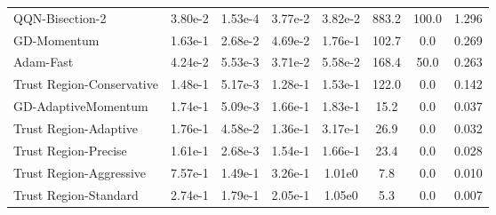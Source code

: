 \documentclass{article}
\begin{document}
\begin{table}[htbp]
{\begin{tabular}{p{2.5cm}*{7}{c}}
QQN-Bisection-2 & 3.80e-2 & 1.53e-4 & 3.77e-2 & 3.82e-2 & 883.2 & 100.0 & 1.296 \\
GD-Momentum & 1.63e-1 & 2.68e-2 & 4.69e-2 & 1.76e-1 & 102.7 & 0.0 & 0.269 \\
Adam-Fast & 4.24e-2 & 5.53e-3 & 3.71e-2 & 5.58e-2 & 168.4 & 50.0 & 0.263 \\
Trust Region-Conservative & 1.48e-1 & 5.17e-3 & 1.28e-1 & 1.53e-1 & 122.0 & 0.0 & 0.142 \\
GD-AdaptiveMomentum & 1.74e-1 & 5.09e-3 & 1.66e-1 & 1.83e-1 & 15.2 & 0.0 & 0.037 \\
Trust Region-Adaptive & 1.76e-1 & 4.58e-2 & 1.36e-1 & 3.17e-1 & 26.9 & 0.0 & 0.032 \\
Trust Region-Precise & 1.61e-1 & 2.68e-3 & 1.54e-1 & 1.66e-1 & 23.4 & 0.0 & 0.028 \\
Trust Region-Aggressive & 7.57e-1 & 1.49e-1 & 3.26e-1 & 1.01e0 & 7.8 & 0.0 & 0.010 \\
Trust Region-Standard & 2.74e-1 & 1.79e-1 & 2.05e-1 & 1.05e0 & 5.3 & 0.0 & 0.007 \\
\bottomrule
\end{tabular}
}
\end{table}
\end{document}
